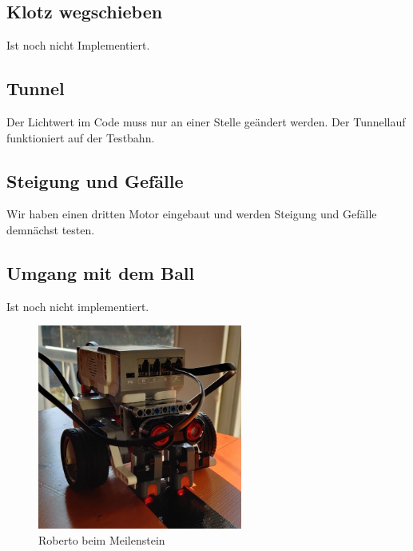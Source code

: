 \documentclass[11pt]{article}
\begin{document}
\subsection{Klotz wegschieben}
Ist noch nicht Implementiert.

\subsection{Tunnel}
Der Lichtwert im Code muss nur an einer Stelle geändert werden. Der Tunnellauf funktioniert auf der Testbahn.

\subsection{Steigung und Gefälle}
Wir haben einen dritten Motor eingebaut und werden Steigung und Gefälle demnächst testen.

\subsection{Umgang mit dem Ball}
Ist noch nicht implementiert.

\begin{figure}[H]
  \centering
  \includegraphics[width=0.6\textwidth]{roberto_alt.jpeg}
  \caption{Roberto beim Meilenstein}
  \label{Figure:roberto_alt}
\end{figure}
\end{document}
